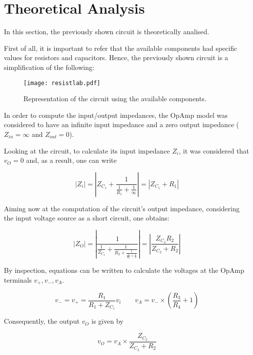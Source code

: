 
\section{Theoretical Analysis}
\label{sec:analysis}
\vspace{3mm}
\par In this section, the previously shown circuit is theoretically analised.
\vspace{3mm}
\par First of all, it is important to refer that the available components had specific values for resistors and capacitors. Hence, the previously shown circuit is a simplification of the following:

\begin{figure}[h] \centering
\texttt{[image: resistlab.pdf]}
\caption{Representation of the circuit using the available components.}
\label{fig_circ2}
\end{figure}


In order to compute the input/output impedances, the OpAmp model was considered to have an infinite input impedance and a zero output impedance ($Z_{in}=\infty$ and $Z_{out}=0$).\par
Looking at the circuit, to calculate its input impedance $Z_i$, it was considered that $v_O=0$ and, as a result, one can write

\begin{equation}
  |Z_i| = \left| Z_{C_{1}}+\frac{1}{\frac{1}{R_1}+\frac{1}{\infty}}\right|=| Z_{C_{1}}+R_1|
\end{equation}


Aiming now at the computation of the circuit's output impedance, considering the input voltage source as a short circuit, one obtains:

\begin{equation}
  |Z_O|=\left|\frac{1}{\frac{1}{Z_{C_2}}+\frac{1}{R_2+   \frac{1}{\frac{1}{R_3}+\frac{1}{0} }}}\right| = \left|\frac{Z_{C_{2}}R_2}{Z_{C_{2}}+R_2}\right|
\end{equation}

By inspection, equations can be written to calculate the voltages at the OpAmp terminals $v_{+},v_-,v_A$.

\begin{equation}
  v_-=v_+=\frac{R_1}{R_1+Z_{C_{1}}}v_i  \quad  \quad  v_A=v_-\times\left(\frac{R_3}{R_4}+1\right)
\end{equation}

Consequently, the output $v_O$ is given by

\begin{equation}
  v_O=v_A\times \frac{Z_{C_{2}}}{Z_{C_{2}}+R_2}
\end{equation}

